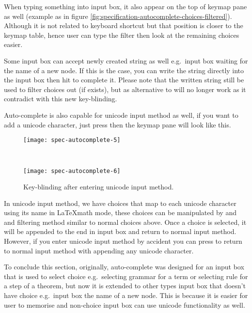 \documentclass[master.tex]{subfiles}
\begin{document}
When typing something into input box, it also appear on the top of keymap pane
as well (example as in figure
\ref{fig:specification-autocomplete-choices-filtered}). Although it is not
related to keyboard shortcut but that position is closer to the keymap table,
hence user can type the filter then look at the remaining choices easier.

Some input box can accept newly created string as well e.g.\ input box waiting
for the name of a new node. If this is the case, you can write the string
directly into the input box then hit  to complete it. Please note
that the written string still be used to filter choices out (if exists), but
 as alternative to  will no longer work as it
contradict with this new key-blinding.

Auto-complete is also capable for unicode input method as well, if you want to
add a unicode character, just press  then the keymap pane will look
like this.

\begin{figure}[H]
    \centering

\begin{minipage}{0.40\textwidth}
\begin{flushleft}
    \texttt{[image: spec-autocomplete-5]}
\end{flushleft}
\end{minipage}
~
\begin{minipage}{0.40\textwidth}
\begin{flushright}
    \texttt{[image: spec-autocomplete-6]}
\end{flushright}
\end{minipage}
\caption{Key-blinding after entering unicode input method.}
\label{fig:specification-autocomplete-choices-unicode}
\end{figure}

In unicode input method, we have choices that map to each unicode character
using its name in \LaTeX math mode, these choices can be manipulated by
\pkbd{Alt-[} and \pkbd{Alt-]} and filtering method similar to normal choices
above. Once a choice is selected, it will be appended to the end in input box
and return to normal input method. However, if you enter unicode input method by
accident you can press  to return to normal input method with
appending any unicode character.

To conclude this section, originally, auto-complete was designed for an input
box that is used to select choice e.g.\ selecting grammar for a term or
selecting rule for a step of a theorem, but now it is extended to other types
input box that doesn't have choice e.g.\ input box the name of a new node. This
is because it is easier for user to memorise and non-choice input box can use
unicode functionality as well.
\end{document}
